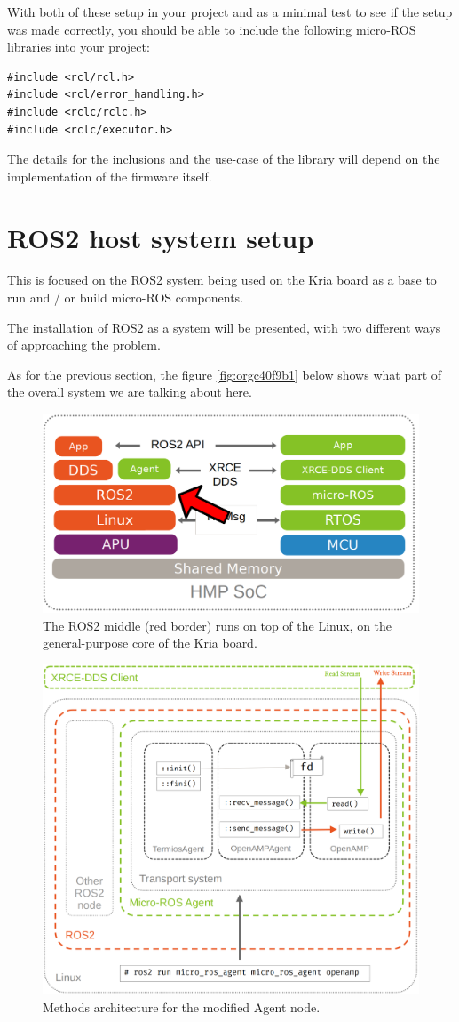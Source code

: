 \documentclass[10pt]{article}
\begin{document}
\pagebreak
With both of these setup in your project and as a minimal test to see if the setup was made correctly,
you should be able to include the following micro-ROS libraries into your project:
\begin{verbatim}
#include <rcl/rcl.h>
#include <rcl/error_handling.h>
#include <rclc/rclc.h>
#include <rclc/executor.h>
\end{verbatim}

The details for the inclusions and the use-case of the library will depend on the implementation
of the firmware itself.
\clearpage
\section{ROS2 host system setup}
\label{sec:org50a2b69}
This is focused on the ROS2 system being used on the Kria board as a base to run and / or build
micro-ROS components.

The installation of ROS2 as a system will be presented, with
two different ways of approaching the problem.

As for the previous section, the figure \ref{fig:orgc40f9b1} below shows what part
of the overall system we are talking about here.

\begin{figure}[htbp]
\centering
\includegraphics[width=.6\textwidth]{./img/map_ros.png}
\caption{\label{fig:org728bca2}The ROS2 middle (red border) runs on top of the Linux, on the general-purpose core of the Kria board.}
\end{figure}

\begin{figure}[htbp]
\centering
\includegraphics[width=.55\textwidth]{./img/agent_arch.png}
\caption{\label{fig:org97c7dd4}Methods architecture for the modified Agent node.}
\end{figure}
\end{document}
